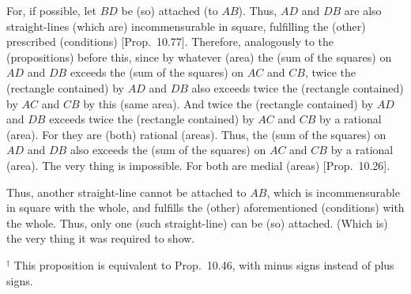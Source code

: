 \begin{Parallel}{}{}
{For, if possible, let $BD$ be (so) attached (to $AB$). Thus, $AD$ and
$DB$ are also straight-lines (which are) incommensurable in square,
fulfilling the (other) prescribed  (conditions) [Prop.~10.77]. Therefore, analogously to the
(propositions) before this, since by whatever (area)
the (sum of the squares) on $AD$ and $DB$ exceeds the (sum of the
squares) on $AC$ and $CB$,  twice the (rectangle contained)
by $AD$ and $DB$ also exceeds twice the (rectangle contained) by
$AC$ and $CB$ by this (same area). And twice the (rectangle contained) by $AD$ and
$DB$ exceeds twice the (rectangle contained) by $AC$ and
$CB$ by a rational (area). For they are (both) rational (areas).
Thus, the (sum of the squares) on 
$AD$ and $DB$ also exceeds the (sum of the squares) on $AC$ and $CB$
by a rational (area). The very thing is impossible. For both are
medial (areas) [Prop.~10.26].

 Thus, another
straight-line cannot be attached to $AB$, which is incommensurable
in square with the whole, and fulfills the (other) aforementioned (conditions) with the
whole. Thus, only one (such straight-line) can be (so) attached. (Which is)
the very thing it was required to show.}
\end{Parallel}
{\footnotesize\noindent$^\dag$
This proposition is equivalent to Prop.~10.46, with minus signs instead of
plus signs.}


